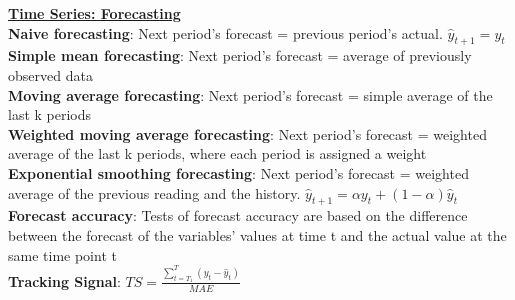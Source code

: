 \documentclass[a4paper,7pt,landscape]{extarticle}
\begin{document}
\begin{multicols}{3}
\begin{boxA}
\underline{\textbf{Time Series: Forecasting}}\\
\textbf{Naive forecasting}: Next period's forecast = previous period's actual. $\hat{y}_{t+1} = y_t$\\
\textbf{Simple mean forecasting}: Next period's forecast = average of previously observed data\\
\textbf{Moving average forecasting}: Next period's forecast = simple average of the last k periods\\
\textbf{Weighted moving average forecasting}: Next period's forecast = weighted average of the last k periods, where each period is assigned a weight\\
\textbf{Exponential smoothing forecasting}: Next period’s forecast = weighted average of the previous reading and the history. $\hat{y}_{t+1} = \alpha y_t + (1-\alpha)\hat{y}_t$\\
\textbf{Forecast accuracy}: Tests of forecast accuracy are based on the difference between the forecast of the variables’ values at time t and the actual value at the same time point t\\
\textbf{Tracking Signal}: $TS = \frac{\sum_{t=T_1}^T (y_t - \hat{y}_t)}{MAE}$
\end{boxA}


\end{multicols}
\end{document}
